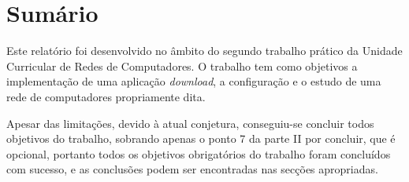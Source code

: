 \section*{Sumário}

Este relatório foi desenvolvido no âmbito do segundo trabalho prático da Unidade Curricular de Redes de Computadores. O trabalho tem como objetivos a implementação de uma aplicação \emph{download}, a configuração e o estudo de uma rede de computadores propriamente dita.

\noindent Apesar das limitações, devido à atual conjetura, conseguiu-se concluir todos objetivos do trabalho, sobrando apenas o ponto 7 da parte II por concluir, que é opcional, portanto todos os objetivos obrigatórios do trabalho foram concluídos com sucesso, e as conclusões podem ser encontradas nas secções apropriadas.
